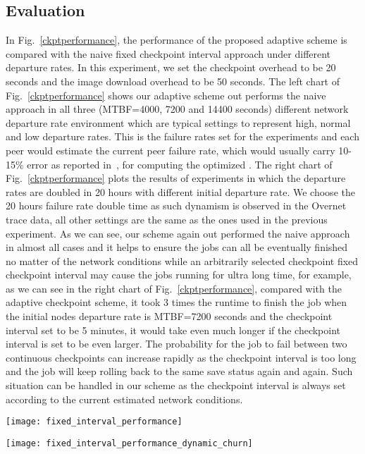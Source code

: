 \documentclass[times, 12pt, onecolumn]{article}
\newcommand{\reffig}[1]{Fig.~\ref{#1}}
\begin{document}
\subsection{Evaluation}
In \reffig{ckptperformance}, the performance of the proposed adaptive scheme is compared with the naive fixed
checkpoint interval approach under different departure rates. In this experiment, we set the checkpoint overhead 
to be 20 seconds and the image download overhead to be 50 seconds. The left chart of \reffig{ckptperformance} shows 
our adaptive scheme out performs the naive approach in all three (MTBF=4000, 7200 and 14400 seconds) different 
network departure rate environment which are typical settings to represent high, normal and low departure rates.
This is the failure rates set for the experiments and each peer would estimate the current peer failure rate, which 
would usually carry 10-15\% error as reported in~\cite{estimation}, for computing the optimized . 
The right chart of \reffig{ckptperformance} plots the results of experiments in which the departure rates are 
doubled in 20 hours with different initial departure rate. We choose the 20 hours failure rate double time as such
dynamism is observed in the Overnet trace data, all other settings are the same as the ones used in the previous experiment. 
As we can see, our scheme again out performed the naive approach in almost all cases and it helps to ensure
the jobs can all be eventually finished no matter of the network conditions while an arbitrarily selected checkpoint 
fixed checkpoint interval may cause the jobs running for ultra long time, for example, as we can see in the right 
chart of \reffig{ckptperformance}, compared with the adaptive checkpoint scheme, it took 3 times the runtime to finish 
the job when the initial nodes departure rate is MTBF=7200 seconds and the checkpoint interval set to be 5 minutes, it would 
take even much longer if the checkpoint interval is set to be even larger. The probability for the job to fail between 
two continuous checkpoints can increase rapidly as the checkpoint interval is too long and the job will keep rolling 
back to the same save status again and again. Such situation can be handled in our scheme as the checkpoint 
interval is always set according to the current estimated network conditions.    
    
\begin{figure*}
\begin{minipage}[b]{0.46\linewidth}
\centering
\texttt{[image: fixed\_interval\_performance]}
\end{minipage}
\begin{minipage}[b]{0.33\linewidth}
\centering
\texttt{[image: fixed\_interval\_performance\_dynamic\_churn]}
\end{minipage}
\caption{Performance Comparison Between the Adaptive Checkpoint and Fixed Intervals Approach.}
\label{ckptperformance}
\end{figure*}
\end{document}
